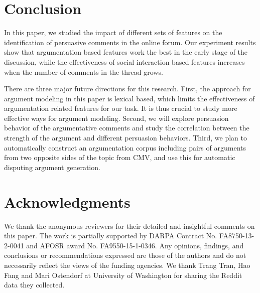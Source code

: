 \documentclass[11pt]{article}
\begin{document}
\section{Conclusion}

In this paper, we studied the impact of different sets of features on the identification of persuasive comments in the online forum. Our experiment results show that argumentation based features work the best in the early stage of the discussion, while the effectiveness of social interaction based features increases when the number of comments in the thread grows. 

There are three major future directions for this research. First, the approach for argument modeling in this paper is lexical based, which limits the effectiveness of argumentation related features for our task. It is thus crucial to study more effective ways for argument modeling. Second, we will explore persuasion behavior of the argumentative comments and study the correlation between the strength of the argument and different persuasion behaviors. Third, we plan to automatically construct an argumentation corpus including pairs of arguments from two opposite sides of the topic from CMV, and use this for automatic disputing argument generation. 


\section*{Acknowledgments}
We thank the anonymous reviewers for their detailed and insightful comments on this paper. The work is partially supported by DARPA Contract No. FA8750-13-2-0041 and AFOSR award No. FA9550-15-1-0346. Any opinions, findings, and conclusions or recommendations expressed are those of the authors and do not necessarily reflect the views of the funding agencies. We thank Trang Tran, Hao Fang and Mari Ostendorf at University of Washington for sharing the Reddit data they collected.



\end{document}
